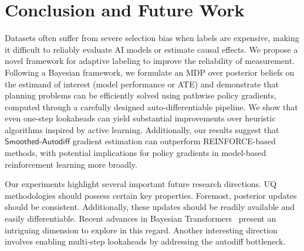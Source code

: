 \section{Conclusion and Future Work}\label{sec:conclusion}

Datasets often suffer from severe selection bias when labels are expensive, 
making it difficult to reliably evaluate AI models or estimate causal effects. 
We propose a novel framework for adaptive labeling 
to improve the reliability of measurement.
Following a Bayesian framework, we formulate an MDP over posterior beliefs on the estimand of interest (model performance or ATE)
and demonstrate that 
planning problems can be efficiently solved using pathwise policy gradients, 
computed through a carefully designed auto-differentiable pipeline. 
We show that even one-step lookaheads can yield substantial improvements over heuristic algorithms inspired by active learning. 
Additionally, our results suggest that $\mathsf{Smoothed\text{-}Autodiff}$ gradient estimation can outperform \textsf{REINFORCE}-based methods, 
with potential implications for policy gradients in model-based reinforcement learning more broadly.  

Our experiments highlight several important future research directions. UQ methodologies should possess certain key properties.
Foremost,
posterior updates  should be consistent. 
Additionally, these updates should be readily available and easily differentiable.  Recent advances in  Bayesian 
Transformers~\citep{NguyenGr22, MullerHoArGrHu22} present an intriguing dimension to explore in this regard. 
Another interesting direction involves enabling multi-step lookaheads by addressing the autodiff bottleneck.


